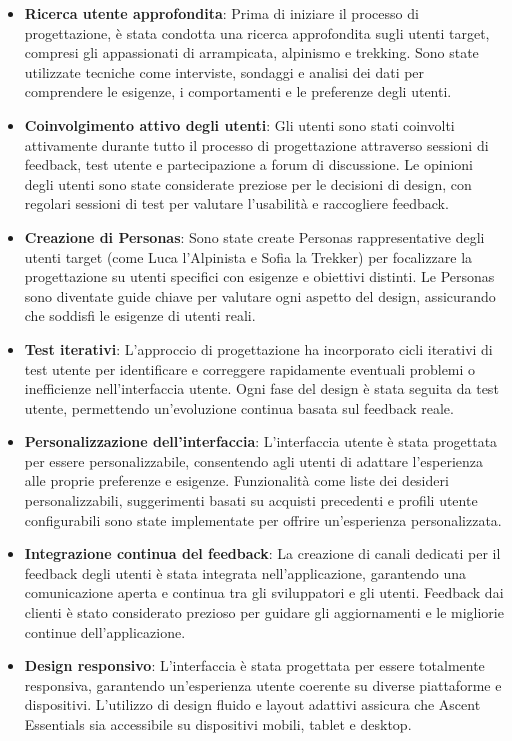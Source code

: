 \begin{itemize}
    \item \textbf{Ricerca utente approfondita}: Prima di iniziare il processo di progettazione, è stata condotta una ricerca approfondita sugli utenti target, compresi gli appassionati di arrampicata, alpinismo e trekking. Sono state utilizzate tecniche come interviste, sondaggi e analisi dei dati per comprendere le esigenze, i comportamenti e le preferenze degli utenti.
    \item \textbf{Coinvolgimento attivo degli utenti}: Gli utenti sono stati coinvolti attivamente durante tutto il processo di progettazione attraverso sessioni di feedback, test utente e partecipazione a forum di discussione. Le opinioni degli utenti sono state considerate preziose per le decisioni di design, con regolari sessioni di test per valutare l'usabilità e raccogliere feedback.
    \item \textbf{Creazione di Personas}: Sono state create Personas rappresentative degli utenti target (come Luca l'Alpinista e Sofia la Trekker) per focalizzare la progettazione su utenti specifici con esigenze e obiettivi distinti. Le Personas sono diventate guide chiave per valutare ogni aspetto del design, assicurando che soddisfi le esigenze di utenti reali.
    \item \textbf{Test iterativi}: L'approccio di progettazione ha incorporato cicli iterativi di test utente per identificare e correggere rapidamente eventuali problemi o inefficienze nell'interfaccia utente. Ogni fase del design è stata seguita da test utente, permettendo un'evoluzione continua basata sul feedback reale.
    \item \textbf{Personalizzazione dell'interfaccia}: L'interfaccia utente è stata progettata per essere personalizzabile, consentendo agli utenti di adattare l'esperienza alle proprie preferenze e esigenze. Funzionalità come liste dei desideri personalizzabili, suggerimenti basati su acquisti precedenti e profili utente configurabili sono state implementate per offrire un'esperienza personalizzata.
    \item \textbf{Integrazione continua del feedback}: La creazione di canali dedicati per il feedback degli utenti è stata integrata nell'applicazione, garantendo una comunicazione aperta e continua tra gli sviluppatori e gli utenti. Feedback dai clienti è stato considerato prezioso per guidare gli aggiornamenti e le migliorie continue dell'applicazione.
    \item \textbf{Design responsivo}: L'interfaccia è stata progettata per essere totalmente responsiva, garantendo un'esperienza utente coerente su diverse piattaforme e dispositivi. L'utilizzo di design fluido e layout adattivi assicura che Ascent Essentials sia accessibile su dispositivi mobili, tablet e desktop.

\end{itemize}

